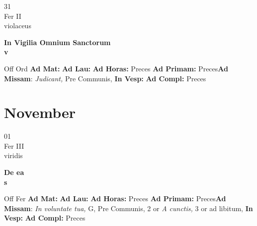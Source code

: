 \documentclass[10pt, openany]{book}
\begin{document}
    \begin{center}
        \begin{minipage}{3.5in}
            \vspace{2em}
            \begin{minipage}{0.5in}
                {\Huge 31} \\
                {\normalsize Fer II} \\
                {\normalsize violaceus}
            \end{minipage}
            \begin{minipage}{3.0in}
                \textbf{ \large In Vigilia Omnium Sanctorum \\
                \textnormal{\normalsize v}} \\ 
            \end{minipage}
            \begin{justify}Off Ord
                \textbf{Ad Mat: }
                \textbf{Ad Lau: }
                \textbf{Ad Horas: }Preces
                \textbf{Ad Primam: }Preces\textbf{Ad Missam}: \textit{Judicant,} Pre Communis,  
                \textbf{In Vesp: }
                \textbf{Ad Compl: }Preces
            \end{justify}
        \end{minipage}
    \end{center}

    \chapter{November}
                    
    \begin{center}
        \begin{minipage}{3.5in}
            \vspace{2em}
            \begin{minipage}{0.5in}
                {\Huge 01} \\
                {\normalsize Fer III} \\
                {\normalsize viridis}
            \end{minipage}
            \begin{minipage}{3.0in}
                \textbf{ \large De ea \\
                \textnormal{\normalsize s}} \\ 
            \end{minipage}
            \begin{justify}Off Fer
                \textbf{Ad Mat: }
                \textbf{Ad Lau: }
                \textbf{Ad Horas: }Preces
                \textbf{Ad Primam: }Preces\textbf{Ad Missam}: \textit{In voluntate tua,} G, Pre Communis, 2 or \textit{A cunctis,} 3 or ad libitum,  
                \textbf{In Vesp: }
                \textbf{Ad Compl: }Preces
            \end{justify}
        \end{minipage}
    \end{center}
\end{document}
